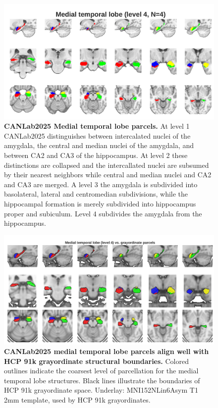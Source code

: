\documentclass[10pt,letterpaper]{article}
\begin{document}
\begin{figure}[t]
\begin{minipage}{\linewidth}
\end{minipage}
\begin{minipage}{\linewidth}
\includegraphics[width=\linewidth]{images/mtl_coarsest.png}
\end{minipage}
\caption{
{\bf
CANLab2025 Medial temporal lobe parcels.} At level 1 CANLab2025 distinguishes between intercalated nuclei of the amygdala, the central and median nuclei of the amygdala, and between CA2 and CA3 of the hippocampus. At level 2 these distinctions are collapsed and the intercallated nuclei are subsumed by their nearest neighbors while central and median nuclei and CA2 and CA3 are merged. A level 3 the amygdala is subdivided into basolateral, lateral and centromedian subdivisions, while the hippocampal formation is merely subdivided into hippocampus proper and subiculum. Level 4 subdivides the amygdala from the hippocampus.
}
\label{mtl-granularities-figure}
\end{figure}


\begin{figure}[t!]
\centering
\includegraphics[width=\linewidth]{images/mtl_vs_cifti.png}
\caption{
{\bf
CANLab2025 medial temporal lobe parcels align well with HCP 91k grayordinate structural boundaries.} 
Colored outlines indicate the coarsest level of parcellation for the medial temporal lobe structures. Black lines illustrate the boundaries of HCP 91k grayordinate space. Underlay: MNI152NLin6Asym T1 2mm template, used by HCP 91k grayordinates.}
\label{mtl-vs-cifti-figure}
\end{figure}
\end{document}
